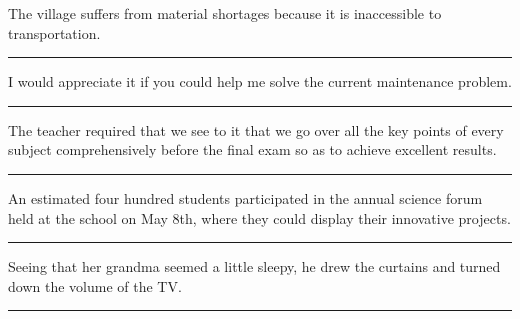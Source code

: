 \documentclass[11pt,a4paper]{article}
\newcommand{\num}[1]{\makebox[1.9em][r]{#1.}\hspace{0.3em}}
\newcommand{\wline}{\noindent\rule{\linewidth}{0.4pt}}
\begin{document}
\vspace{0.35em}\vspace{0.15em}

\begin{minipage}{\linewidth}

\num{9}The village suffers from material shortages because it is inaccessible to transportation.

\vspace{0.25em}

\wline

\end{minipage}

\begin{minipage}{\linewidth}

\num{10}I would appreciate it if you could help me solve the current maintenance problem.

\vspace{0.25em}

\wline

\end{minipage}

\begin{minipage}{\linewidth}

\num{11}The teacher required that we see to it that we go over all the key points of every subject comprehensively before the final exam so as to achieve excellent results.

\vspace{0.25em}

\wline

\end{minipage}

\begin{minipage}{\linewidth}

\num{12}An estimated four hundred students participated in the annual science forum held at the school on May 8th, where they could display their innovative projects.

\vspace{0.25em}

\wline

\end{minipage}

\vspace{0.35em}\vspace{0.15em}

\begin{minipage}{\linewidth}

\num{13}Seeing that her grandma seemed a little sleepy, he drew the curtains and turned down the volume of the TV.

\vspace{0.25em}

\wline

\end{minipage}
\end{document}
